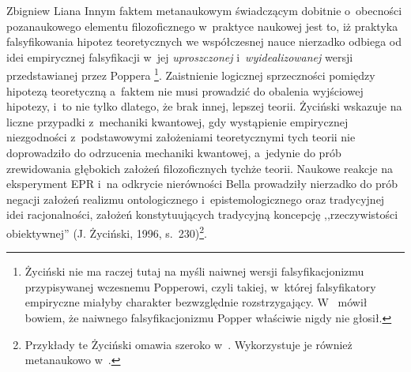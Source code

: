 \begin{artplenv}{Zbigniew Liana}
Innym faktem metanaukowym świadczącym dobitnie o~obecności pozanaukowego elementu filozoficznego w~praktyce naukowej
jest to, iż praktyka falsyfikowania hipotez teoretycznych we współczesnej nauce nierzadko odbiega od idei empirycznej
falsyfikacji w~jej \textit{uproszczonej} i~\textit{wyidealizowanej} wersji przedstawianej przez Poppera
\parencite[zob.][s.~230]{zycinski_elementy_1996}\footnote{Życiński nie ma raczej tutaj na myśli naiwnej wersji
falsyfikacjonizmu przypisywanej wczesnemu Popperowi, czyli takiej, w~której falsyfikatory empiryczne miałyby charakter
bezwzględnie rozstrzygający. W~\parencite[s.~121]{zycinski_jezyk_1983}
mówił
bowiem, że naiwnego falsyfikacjonizmu Popper właściwie nigdy nie głosił.}. Zaistnienie logicznej sprzeczności pomiędzy
hipotezą teoretyczną a~faktem nie musi prowadzić do obalenia wyjściowej hipotezy, i~to nie tylko dlatego, że brak
innej, lepszej teorii. Życiński wskazuje na liczne przypadki z~mechaniki kwantowej, gdy wystąpienie empirycznej
niezgodności z~podstawowymi założeniami teoretycznymi tych teorii nie doprowadziło do odrzucenia mechaniki kwantowej, a~jedynie
do prób zrewidowania głębokich założeń filozoficznych tychże teorii. Naukowe reakcje na eksperyment EPR i~na
odkrycie nierówności Bella prowadziły nierzadko do prób negacji założeń realizmu ontologicznego i~epistemologicznego
oraz tradycyjnej idei racjonalności, założeń konstytuujących tradycyjną koncepcję ,,rzeczywistości obiektywnej''
\label{ref:RND9B582PV6dW}(J. Życiński, 1996, s.~230)\footnote{Przykłady te Życiński omawia szeroko
w~\parencite*[s.~175–180]{zycinski_teizm_1985}.
Wykorzystuje je również metanaukowo
w~\parencites[s.~129n.137]{zycinski_structure_1988}[s.~228nn.243]{zycinski_struktura_2013}[s.~230]{zycinski_elementy_1996}.
}.


\end{artplenv}

